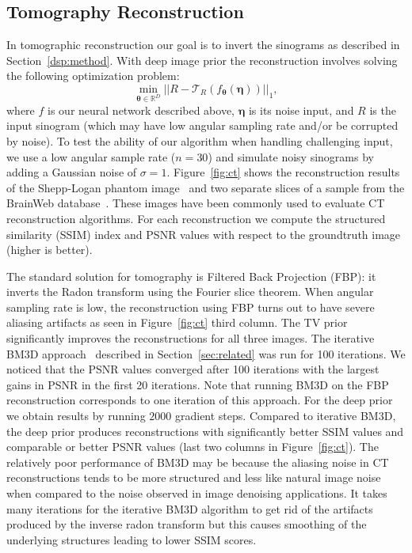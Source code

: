 \subsection{Tomography Reconstruction}
In tomographic reconstruction our goal is to invert the sinograms as described in Section~\ref{dsp:method}.
With deep image prior the reconstruction involves solving the following optimization problem:
\begin{equation}
	\min_{\bm{\theta} \in \mathbb{R}^D} ||R - \mathcal{T}_R(f_{\bm{\theta}}(\bm{\eta}))||_1,
\end{equation}
where $f$ is our neural network described above, $\bm{\eta}$ is its noise input, and $R$ is the input sinogram (which may have low angular sampling rate and/or be corrupted by noise). To test the ability of our algorithm when handling challenging input, we use a low angular sample rate ($n=30$) and simulate noisy sinograms by adding a Gaussian noise of $\sigma=1$.
Figure~\ref{fig:ct} shows the reconstruction results of the Shepp-Logan phantom image~\cite{shepp1974fourier} and two separate slices of a sample from the BrainWeb database~\cite{cocosco1997brainweb}.
These images have been commonly used to evaluate CT reconstruction algorithms.
For each reconstruction we compute the structured similarity (SSIM) index and PSNR values with respect to the groundtruth image (higher is better).

The standard solution for tomography is Filtered Back Projection (FBP): it inverts the Radon transform using the Fourier slice theorem. When angular sampling rate is low, the reconstruction using FBP turns out to have severe aliasing artifacts as seen in Figure~\ref{fig:ct} third column.
The TV prior significantly improves the reconstructions for all three images.
The iterative BM3D approach~\cite{maggioni2013nonlocal} described in Section~\ref{sec:related} was run for 100 iterations. We noticed that the PSNR values converged after 100 iterations with the largest gains in PSNR in the first 20 iterations.
Note that running BM3D on the FBP reconstruction corresponds to one iteration of this approach.
For the deep prior we obtain results by running $2000$ gradient steps.
Compared to iterative BM3D, the deep prior produces reconstructions with significantly better SSIM values and comparable or better PSNR values (last two columns in Figure~\ref{fig:ct}).
The relatively poor performance of BM3D may be because the aliasing noise in CT reconstructions tends to be more structured and less like natural image noise when compared to the noise observed in image denoising applications.
It takes many iterations for the iterative BM3D algorithm to get rid of the artifacts produced by the inverse radon transform but this causes smoothing of the underlying structures leading to lower SSIM scores.

